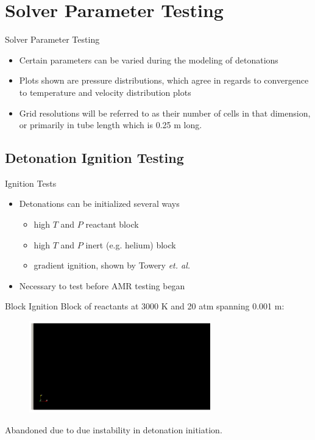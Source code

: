 \section{Solver Parameter Testing}

\begin{frame}{Solver Parameter Testing}
\begin{itemize}
\item Certain parameters can be varied during the modeling of detonations 
\item Plots shown are pressure distributions, which agree in regards to convergence to temperature and velocity distribution plots
\item Grid resolutions will be referred to as their number of cells in that dimension, or primarily in tube length which is 0.25 m long. 
\end{itemize}
\end{frame}

\subsection{Detonation Ignition Testing}

\begin{frame}{Ignition Tests}
\begin{itemize}
\item Detonations can be initialized several ways
\begin{itemize}
    \item high $T$ and $P$ reactant block
    \item high $T$ and $P$ inert (e.g. helium) block
    \item gradient ignition, shown by Towery \textit{et. al.} \cite{towery2}
\end{itemize}
\item Necessary to test before AMR testing began 
\end{itemize}    
\end{frame}

\begin{frame}{Block Ignition}
Block of reactants at 3000 K and 20 atm spanning 0.001 m:
\begin{figure}[]
\centering
\includegraphics[width=0.7\textwidth]{../figs/ignition/block.png}
\end{figure}%
Abandoned due to due instability in detonation initiation.
\end{frame}

